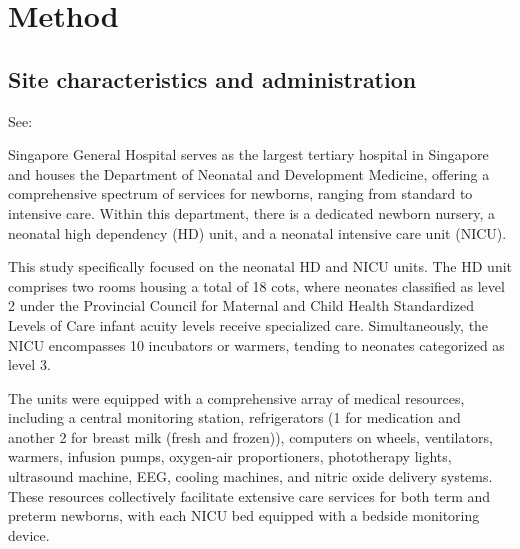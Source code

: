\section{Method}
\label{sec:Method}


\subsection{Site characteristics and administration}

\iftodo
\begin{itemize}[leftmargin=*]
    \begin{itemize}
         See: \citep{Mayhew2022}
    \end{itemize}
    \begin{itemize}
    \end{itemize}
    \begin{itemize}
    \end{itemize}
\end{itemize}
\fi

Singapore General Hospital serves as the largest tertiary hospital in Singapore and houses the Department of Neonatal and Development Medicine, offering a comprehensive spectrum of services for newborns, ranging from standard to intensive care. Within this department, there is a dedicated newborn nursery, a neonatal high dependency (HD) unit, and a neonatal intensive care unit (NICU).

This study specifically focused on the neonatal HD and NICU units. The HD unit comprises two rooms housing a total of 18 cots, where neonates classified as level 2 under the Provincial Council for Maternal and Child Health Standardized Levels of Care infant acuity levels receive specialized care. Simultaneously, the NICU encompasses 10 incubators or warmers, tending to neonates categorized as level 3.

The units were equipped with a comprehensive array of medical resources, including a central monitoring station, refrigerators (1 for medication and another 2 for breast milk (fresh and frozen)), computers on wheels, ventilators, warmers, infusion pumps, oxygen-air proportioners, phototherapy lights, ultrasound machine, EEG, cooling machines, and nitric oxide delivery systems. These resources collectively facilitate extensive care services for both term and preterm newborns, with each NICU bed equipped with a bedside monitoring device. 

